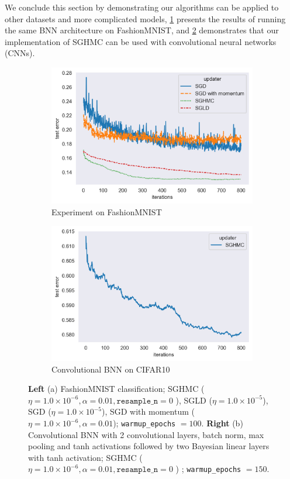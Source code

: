 We conclude this section by demonstrating our algorithms can be applied to other datasets and more complicated models, \cref{fig:fashionMNIST} presents the results of running the same BNN architecture on FashionMNIST, and \cref{fig:CIFAR10} demonstrates that our implementation of SGHMC can be used with convolutional neural networks (CNNs).
\begin{figure}[h!]
\centering
\begin{subfigure}{.5\textwidth}
  \centering
  \includegraphics[width=.95\linewidth]{parts/Images/fashion-mnist.png}
  \caption{Experiment on FashionMNIST}
  \label{fig:fashionMNIST}
\end{subfigure}%
\begin{subfigure}{.5\textwidth}
  \centering
  \includegraphics[width=.95\linewidth]{parts/Images/CIFAR10.png}
  \caption{Convolutional BNN on CIFAR10}
  \label{fig:CIFAR10}
\end{subfigure}
\caption{{\bf Left} (a) FashionMNIST classification; SGHMC ($\eta = 1.0\times 10^{-6}, \alpha=0.01, \texttt{resample\_n} =0$ ), SGLD ($\eta = 1.0\times 10^{-5}$), SGD ($\eta = 1.0\times 10^{-5}$), SGD with momentum ($\eta = 1.0\times 10^{-6}, \alpha=0.01$); \texttt{warmup\_epochs} $= 100$. {\bf Right} (b) Convolutional BNN with 2 convolutional layers, batch norm, max pooling and tanh activations followed by two Bayesian linear layers with tanh activation;  SGHMC ($\eta = 1.0\times 10^{-6}, \alpha=0.01, \texttt{resample\_n} =0$ ) ; \texttt{warmup\_epochs} $= 150$.}
\label{fig:other-datasets}
\end{figure}

